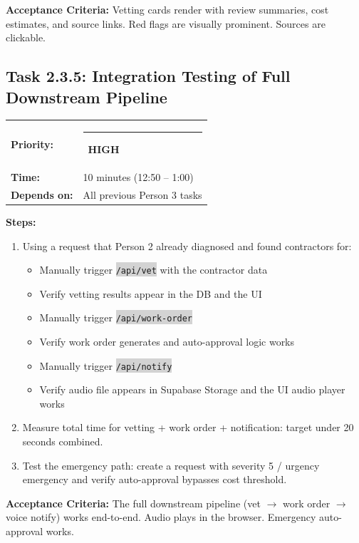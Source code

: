 \documentclass[11pt, a4paper]{article}
\newcommand{\highpri}{\textcolor{highamber}{\rule{6pt}{6pt}}~\textcolor{highamber}{\scriptsize\textbf{HIGH}}}
\newcommand{\code}[1]{\texttt{\small\colorbox{lightgray}{#1}}}
\begin{document}
\textbf{Acceptance Criteria:} Vetting cards render with review summaries, cost estimates, and source links. Red flags are visually prominent. Sources are clickable.

\vspace{1em}

\subsection{Task 2.3.5: Integration Testing of Full Downstream Pipeline}

\begin{tabularx}{\textwidth}{lX}
\textbf{Priority:} & \highpri \\
\textbf{Time:} & 10 minutes (12:50 -- 1:00) \\
\textbf{Depends on:} & All previous Person 3 tasks \\
\end{tabularx}

\vspace{0.3em}

\textbf{Steps:}
\begin{enumerate}[leftmargin=2em, itemsep=2pt]
  \item Using a request that Person 2 already diagnosed and found contractors for:
    \begin{itemize}[itemsep=1pt]
      \item Manually trigger \code{/api/vet} with the contractor data
      \item Verify vetting results appear in the DB and the UI
      \item Manually trigger \code{/api/work-order}
      \item Verify work order generates and auto-approval logic works
      \item Manually trigger \code{/api/notify}
      \item Verify audio file appears in Supabase Storage and the UI audio player works
    \end{itemize}
  \item Measure total time for vetting + work order + notification: target under 20 seconds combined.
  \item Test the emergency path: create a request with severity 5 / urgency emergency and verify auto-approval bypasses cost threshold.
\end{enumerate}

\textbf{Acceptance Criteria:} The full downstream pipeline (vet $\rightarrow$ work order $\rightarrow$ voice notify) works end-to-end. Audio plays in the browser. Emergency auto-approval works.
\end{document}
